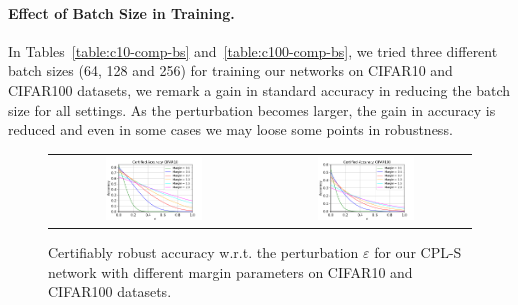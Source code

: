 \begin{table}[h]
\begin{tabular}
  \bottomrule
  \end{tabular}%
  \caption{Results on the CIFAR100 dataset on standard and  provably certifiable accuracies for different values of perturbations $\varepsilon$ on CPL (ours) models with various batch sizes. The average time per epoch in seconds is also reported in the last column. All the reported networks use Last Layer Normalization.}
  \label{table:c100-comp-bs}%
\end{table}%

\paragraph{Effect of Batch Size in Training.}
In Tables~\ref{table:c10-comp-bs} and~\ref{table:c100-comp-bs}, we tried three different batch sizes (64, 128 and 256) for training our networks on CIFAR10 and CIFAR100 datasets, we remark a gain in standard accuracy in reducing the batch size for all settings. As the perturbation becomes larger, the gain in accuracy is reduced and even in some cases we may loose some points in robustness.





\begin{figure}[h]
    \centering
    \begin{tabular}{cc}
    \includegraphics[width=0.48\textwidth]{sections/4_certification/images/cert_acc_margin_eps_c10.pdf}&\includegraphics[width=0.48\textwidth]{sections/4_certification/images/cert_acc_margin_eps_c100.pdf}
    \end{tabular}
    \caption{Certifiably robust accuracy w.r.t. the perturbation $\varepsilon$ for our CPL-S  network with different margin parameters on CIFAR10 and CIFAR100 datasets.}
    \label{fig:cert-acc-margin}
\end{figure}


